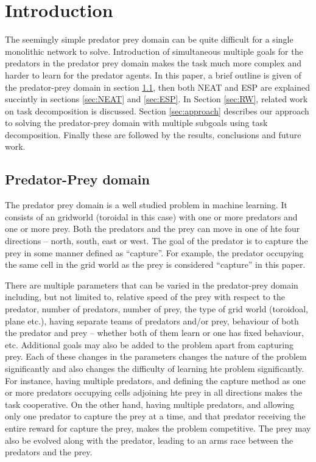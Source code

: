 \section{Introduction}
\label{sec:Intro}
The seemingly simple predator prey domain can be quite difficult for a single monolithic network to solve. Introduction of simultaneous multiple goals for the predators in the predator prey domain makes the task much more complex and harder to learn for the predator agents.
    In this paper, a brief outline is given of the predator-prey domain in section \ref{sec:PPD}, then both NEAT and ESP are explained succintly in sections \ref{sec:NEAT} and \ref{sec:ESP}. In Section \ref{sec:RW}, related work on task decomposition is discussed. Section \ref{sec:approach} describes our approach to solving the predator-prey domain with multiple subgoals using task decomposition. Finally these are followed by the results, conclusions and future work.

\subsection{Predator-Prey domain}
\label{sec:PPD}
The predator prey domain is a well studied problem in machine learning. It consists of an gridworld (toroidal in this case) with one or more predators and one or more prey. Both the predators and the prey can move in one of hte four directions -- north, south, east or west. The goal of the predator is to capture the prey in some manner defined as ``capture''. For example, the predator occupying the same cell in the grid world as the prey is considered ``capture'' in this paper.

    There are multiple parameters that can be varied in the predator-prey domain including, but not limited to, relative speed of the prey with respect to the predator, number of predators, number of prey, the type of grid world (toroidoal, plane etc.), having separate teams of predators and/or prey, behaviour of both the predator and prey -- whether both of them learn or one has fixed behaviour, etc. Additional goals may also be added to the problem apart from capturing prey. Each of these changes in the parameters changes the nature of the problem significantly and also changes the difficulty of learning hte problem significantly. For instance, having multiple predators, and defining the capture method as one or more predators occupying cells adjoining hte prey in all directions makes the task cooperative. On the other hand, having multiple predators, and allowing only one predator to capture the prey at a time, and that predator receiving the entire reward for capture the prey, makes the problem competitive. The prey may also be evolved along with the predator, leading to an arms race between the predators and the prey.

